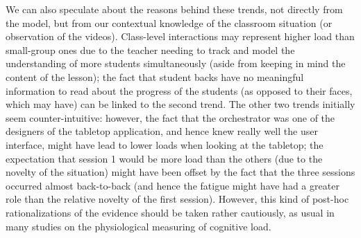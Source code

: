\documentclass[10pt,journal,compsoc]{IEEEtran}
\begin{document}
We can also speculate about the reasons behind these trends, not directly from the model, but from our contextual knowledge of the classroom situation (or observation of the videos). Class-level interactions may represent higher load than small-group ones due to the teacher needing to track and model the understanding of more students simultaneously (aside from keeping in mind the content of the lesson); the fact that student backs have no meaningful information to read about the progress of the students (as opposed to their faces, which may have) can be linked to the second trend. The other two trends initially seem counter-intuitive: however, the fact that the orchestrator was one of the designers of the tabletop application, and hence knew really well the user interface, might have lead to lower loads when looking at the tabletop; the expectation that session 1 would be more load than the others (due to the novelty of the situation) might have been offset by the fact that the three sessions occurred almost back-to-back (and hence the fatigue might have had a greater role than the relative novelty of the first session). However, this kind of post-hoc rationalizations of the evidence should be taken rather cautiously, as usual in many studies on the physiological measuring of cognitive load.

\end{document}
